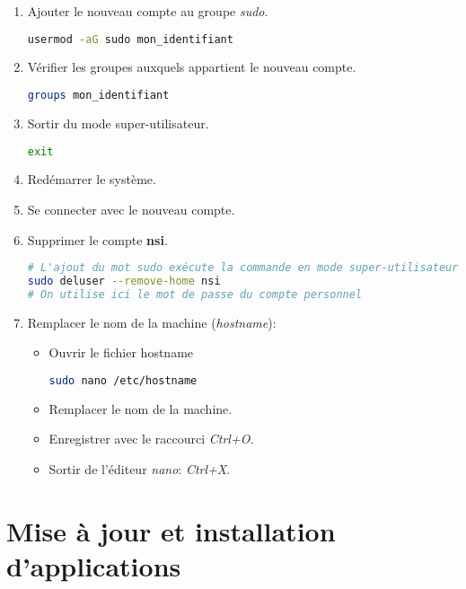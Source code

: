 \documentclass[a4paper,11pt]{article}
\begin{document}
\begin{activite}
\begin{enumerate}
\begin{lstlisting}[language=bash]
            \end{lstlisting}
        \item Ajouter le nouveau compte au groupe \emph{sudo}.
        \begin{lstlisting}[language=bash]
usermod -aG sudo mon_identifiant
            \end{lstlisting}
        \item Vérifier les groupes auxquels appartient le nouveau compte.
        \begin{lstlisting}[language=bash]
groups mon_identifiant
        \end{lstlisting}
        \item Sortir du mode super-utilisateur.
        \begin{lstlisting}[language=bash]
exit
            \end{lstlisting}
        \item Redémarrer le système.
        \item Se connecter avec le nouveau compte.
        \item Supprimer le compte \textbf{nsi}.
        \begin{lstlisting}[language=bash]
# L'ajout du mot sudo exécute la commande en mode super-utilisateur.
sudo deluser --remove-home nsi
# On utilise ici le mot de passe du compte personnel
            \end{lstlisting}
        \item Remplacer le nom de la machine (\emph{hostname}):
        \begin{itemize}
            \item Ouvrir le fichier hostname
            \begin{lstlisting}[language=bash]
sudo nano /etc/hostname
            \end{lstlisting}
            \item Remplacer le nom de la machine.
            \item Enregistrer avec le raccourci \emph{Ctrl+O}.
            \item Sortir de l'éditeur \emph{nano}: \emph{Ctrl+X}.
        \end{itemize}
        
    \end{enumerate}
\end{activite}
\section{Mise à jour et installation d'applications}
\end{document}
